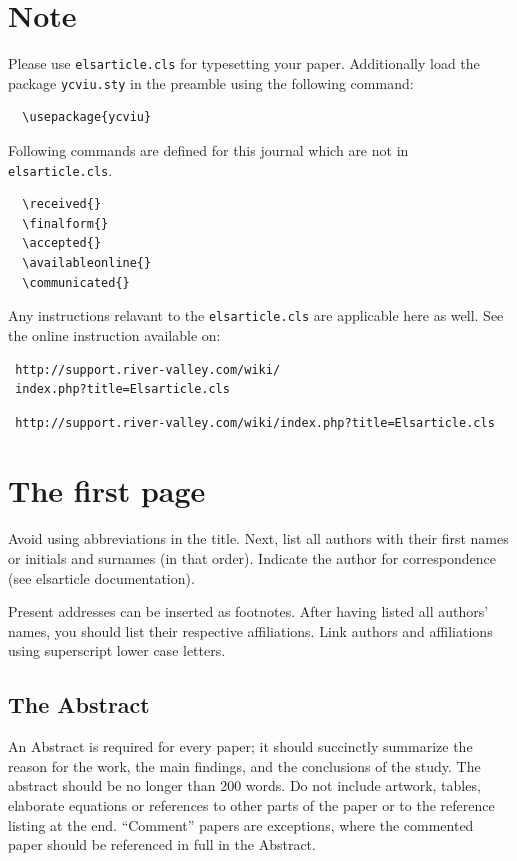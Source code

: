 \documentclass[times,twocolumn,final,authoryear]{elsarticle}
\begin{document}

\section{Note}
\label{sec1}
Please use \verb+elsarticle.cls+ for typesetting your paper.
Additionally load the package \verb+ycviu.sty+ in the preamble using
the following command: 
\begin{verbatim} 
  \usepackage{ycviu}
\end{verbatim}

Following commands are defined for this journal which are not in
\verb+elsarticle.cls+. 
\begin{verbatim}
  \received{}
  \finalform{}
  \accepted{}
  \availableonline{}
  \communicated{}
\end{verbatim}

Any instructions relavant to the \verb+elsarticle.cls+ are applicable
here as well. See the online instruction available on:
\makeatletter
\if@twocolumn
\begin{verbatim}
 http://support.river-valley.com/wiki/
 index.php?title=Elsarticle.cls
\end{verbatim}
\else
\begin{verbatim}
 http://support.river-valley.com/wiki/index.php?title=Elsarticle.cls
\end{verbatim}
\fi

\section{The first page}
Avoid using abbreviations in the title. Next, list all authors with
their first names or initials and surnames (in that order). Indicate
the author for correspondence (see elsarticle documentation).

Present addresses can be inserted as footnotes. After having listed all
authors' names, you should list their respective affiliations. Link
authors and affiliations using superscript lower case letters.

\subsection{The Abstract}
An Abstract is required for every paper; it should succinctly summarize
the reason for the work, the main findings, and the conclusions of the
study. The abstract should be no longer than 200 words. Do not include
artwork, tables, elaborate equations or references to other parts of
the paper or to the reference listing at the end. ``Comment'' papers
are exceptions, where the commented paper should be referenced in full
in the Abstract.
\end{document}
